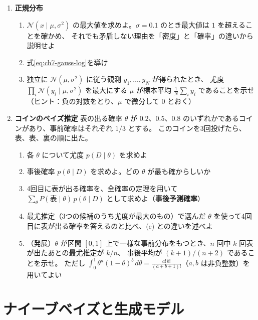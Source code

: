 \begin{enumerate}
  \item \textbf{正規分布}\quad
    \begin{enumerate}
      \item $\mathcal{N}(x \mid \mu, \sigma^2)$ の最大値を求めよ。$\sigma = 0.1$ のとき最大値は $1$ を超えることを確かめ、
        それでも矛盾しない理由を「密度」と「確率」の違いから説明せよ
      \item 式\eqref{eq:ch7-gauss-log}を導け
      \item 独立に $\mathcal{N}(\mu, \sigma^2)$ に従う観測 $y_1, \ldots, y_N$ が得られたとき、
        尤度 $\prod_i \mathcal{N}(y_i \mid \mu, \sigma^2)$ を最大にする $\mu$ が標本平均 $\frac{1}{N}\sum_i y_i$ であることを示せ
        （ヒント：負の対数をとり、$\mu$ で微分して $0$ とおく）
    \end{enumerate}

  \item \textbf{コインのベイズ推定}\quad
    表の出る確率 $\theta$ が $0.2$、$0.5$、$0.8$ のいずれかであるコインがあり、事前確率はそれぞれ $1/3$ とする。
    このコインを3回投げたら、表、表、裏の順に出た。
    \begin{enumerate}
      \item 各 $\theta$ について尤度 $p(D \mid \theta)$ を求めよ
      \item 事後確率 $p(\theta \mid D)$ を求めよ。どの $\theta$ が最も確からしいか
      \item 4回目に表が出る確率を、全確率の定理を用いて $\sum_\theta P(\text{表} \mid \theta)\,p(\theta \mid D)$ として求めよ（\textbf{事後予測確率}）
      \item 最尤推定（3つの候補のうち尤度が最大のもの）で選んだ $\theta$ を使って4回目に表が出る確率を答えるのと比べ、(c) との違いを述べよ
      \item （発展）$\theta$ が区間 $[0, 1]$ 上で一様な事前分布をもつとき、$n$ 回中 $k$ 回表が出たあとの最尤推定が $k/n$、
        事後平均が $(k + 1)/(n + 2)$ であることを示せ。
        ただし $\int_0^1 \theta^a (1 - \theta)^b\,d\theta = \frac{a!\,b!}{(a + b + 1)!}$（$a, b$ は非負整数）を用いてよい
    \end{enumerate}

\end{enumerate}


\clearpage
\section{ナイーブベイズと生成モデル}

